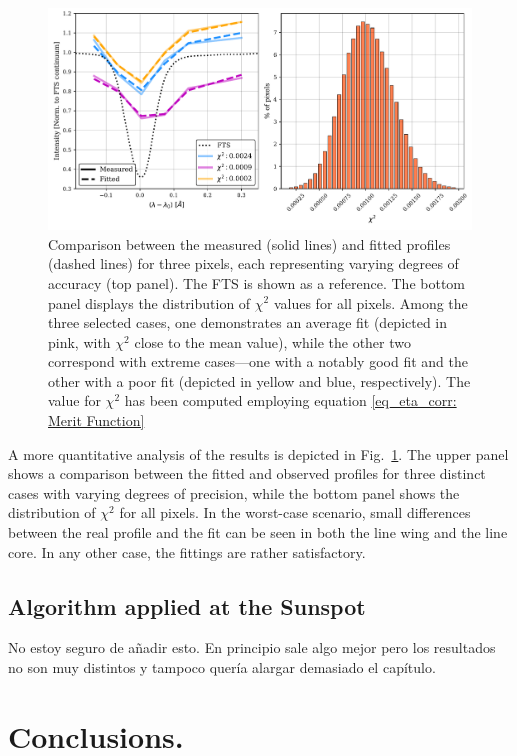 \begin{figure}
  \centering
  \includegraphics[width=\textwidth]{figures/EtalonPaper/fitting_chisq_hor.pdf}
  \caption{Comparison between the measured (solid lines) and fitted profiles (dashed lines) for three pixels, each representing varying degrees of accuracy (top panel). The FTS is shown as a reference. The bottom panel displays the distribution of $\chi^2$ values for all pixels. Among the three selected cases, one demonstrates an average fit (depicted in pink, with $\chi^2$ close to the mean value), while the other two correspond with extreme cases—one with a notably good fit and the other with a poor fit (depicted in yellow and blue, respectively). The value for $\chi ^2$ has been computed employing equation \eqref{eq_eta_corr: Merit Function}\label{fig_etalon_corr: xisq_hrt}}  
\end{figure}

A more quantitative analysis of the results is depicted in Fig.~\ref{fig_etalon_corr: xisq_hrt}. The upper panel shows a comparison between the fitted and observed profiles for three distinct cases with varying degrees of precision, while the bottom panel shows the distribution of $\chi^2$ for all pixels. In the worst-case scenario, small differences between the real profile and the fit can be seen in both the line wing and the line core. In any other case, the fittings are rather satisfactory.


\subsection{Algorithm applied at the Sunspot}

No estoy seguro de añadir esto. En principio sale algo mejor pero los resultados no son muy distintos y tampoco quería alargar demasiado el capítulo. 

\section{Conclusions.}

